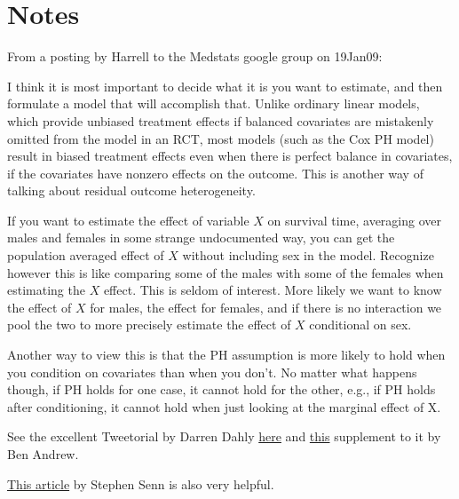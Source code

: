 \section{Notes}
From a posting by Harrell to the Medstats google group on 19Jan09:
{\small
I think it is most important to decide what it is you want to
estimate, and then formulate a model that will accomplish that.
Unlike ordinary linear models, which provide unbiased treatment
effects if balanced covariates are mistakenly omitted from the model
in an RCT, most models (such as the Cox PH model) result in biased
treatment effects even when there is perfect balance in covariates, if
the covariates have nonzero effects on the outcome.  This is another
way of talking about residual outcome heterogeneity.

If you want to estimate the effect of variable $X$ on survival time,
averaging over males and females in some strange undocumented way, you
can get the population averaged effect of $X$ without including sex in
the model.  Recognize however this is like comparing some of the males
with some of the females when estimating the $X$ effect.  This is seldom
of interest.  More likely we want to know the effect of $X$ for males,
the effect for females, and if there is no interaction we pool the two
to more precisely estimate the effect of $X$ conditional on sex.

Another way to view this is that the PH assumption is more likely to
hold when you condition on covariates than when you don't.  No matter
what happens though, if PH holds for one case, it cannot hold for the
other, e.g., if PH holds after conditioning, it cannot hold when just
looking at the marginal effect of X.
}

See the excellent Tweetorial by Darren Dahly
\href{https://twitter.com/statsepi/status/1115902270888128514?s=20}{here}
and
\href{https://twitter.com/BenYAndrew/status/1117777383606706177}{this}
supplement to it by Ben Andrew.

\href{http://www.appliedclinicaltrialsonline.com/well-adjusted-statistician-analysis-covariance-explained}{This article} by Stephen Senn is also very helpful.


\def\apacue{0}
